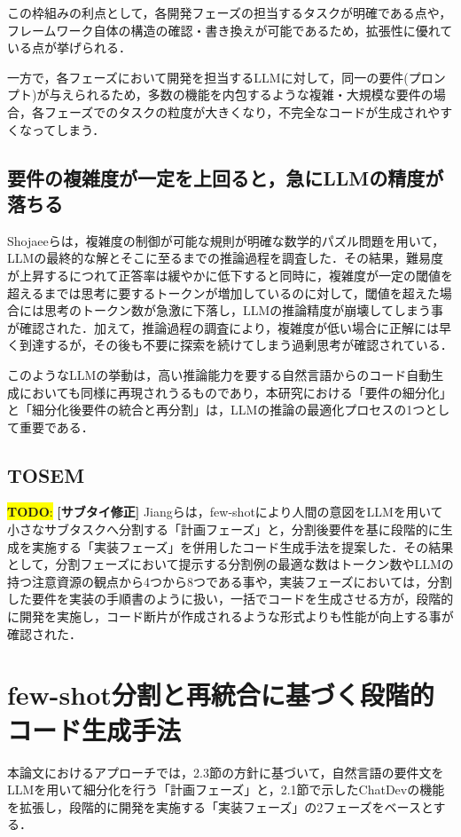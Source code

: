 \documentclass[submit,techrep,noauthor]{ipsj}
\newcommand{\todo}[1]{\colorbox{yellow}{{\bf TODO}:}{\color{red} {\textbf{[#1]}}}}
\begin{document}
この枠組みの利点として，各開発フェーズの担当するタスクが明確である点や，フレームワーク自体の構造の確認・書き換えが可能であるため，拡張性に優れている点が挙げられる．

一方で，各フェーズにおいて開発を担当するLLMに対して，同一の要件(プロンプト)が与えられるため，多数の機能を内包するような複雑・大規模な要件の場合，各フェーズでのタスクの粒度が大きくなり，不完全なコードが生成されやすくなってしまう．


\subsection{要件の複雑度が一定を上回ると，急にLLMの精度が落ちる}
Shojaeeら\cite{IllusionApple}は，複雑度の制御が可能な規則が明確な数学的パズル問題を用いて，LLMの最終的な解とそこに至るまでの推論過程を調査した．その結果，難易度が上昇するにつれて正答率は緩やかに低下すると同時に，複雑度が一定の閾値を超えるまでは思考に要するトークンが増加しているのに対して，閾値を超えた場合には思考のトークン数が急激に下落し，LLMの推論精度が崩壊してしまう事が確認された．加えて，推論過程の調査により，複雑度が低い場合に正解には早く到達するが，その後も不要に探索を続けてしまう過剰思考が確認されている．

このようなLLMの挙動は，高い推論能力を要する自然言語からのコード自動生成においても同様に再現されうるものであり，本研究における「要件の細分化」と「細分化後要件の統合と再分割」は，LLMの推論の最適化プロセスの1つとして重要である．


\subsection{TOSEM}\todo{サブタイ修正}
Jiangら\cite{tosem}は，few-shotにより人間の意図をLLMを用いて小さなサブタスクへ分割する「計画フェーズ」と，分割後要件を基に段階的に生成を実施する「実装フェーズ」を併用したコード生成手法を提案した．その結果として，分割フェーズにおいて提示する分割例の最適な数はトークン数やLLMの持つ注意資源の観点から4つから8つである事や，実装フェーズにおいては，分割した要件を実装の手順書のように扱い，一括でコードを生成させる方が，段階的に開発を実施し，コード断片が作成されるような形式よりも性能が向上する事が確認された．


\section{few-shot分割と再統合に基づく段階的コード生成手法}
本論文におけるアプローチでは，2.3節の方針に基づいて，自然言語の要件文をLLMを用いて細分化を行う「計画フェーズ」と，2.1節で示したChatDevの機能を拡張し，段階的に開発を実施する「実装フェーズ」の2フェーズをベースとする．
\end{document}
